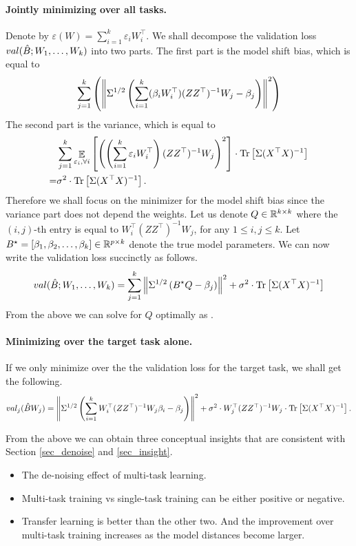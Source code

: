 \paragraph{Jointly minimizing over all tasks.}
Denote by $\varepsilon(W) = \sum_{i=1}^k \varepsilon_i W_i^{\top}$.
We shall decompose the validation loss $val(\hat{B}; W_1, \dots, W_k)$ into two parts.
The first part is the model shift bias, which is equal to
\begin{align*}
	\sum_{j=1}^k \left({\left\| \Sigma^{1/2}\left({\sum_{i=1}^k(\beta_i W_i^{\top}) (ZZ^{\top})^{-1} W_j - \beta_j}\right) \right\|^2}\right)
\end{align*}
The second part is the variance, which is equal to
\begin{align*}
	& \sum_{j=1}^k \mathop{\mathbb{E}}_{\varepsilon_i, \forall i}\left[ \left({\left({\sum_{i=1}^k \varepsilon_i W_i^{\top}}\right) (ZZ^{\top})^{-1} W_j}\right)^2 \right] \cdot {\operatorname{Tr}\left[\Sigma(X^{\top}X)^{-1}\right]} \\
	=& \sigma^2 \cdot \operatorname{Tr}\left[\Sigma (X^{\top}X)^{-1}\right].
\end{align*}
Therefore we shall focus on the minimizer for the model shift bias since the variance part does not depend the weights.
Let us denote $Q\in\mathbb{R}^{k\times k}$ where the $(i,j)$-th entry is equal to $W_i^{\top} (ZZ^{\top})^{-1} W_j$, for any $1\le i, j\le k$.
Let $B^{\star} = [\beta_1, \beta_2, \dots, \beta_k] \in\mathbb{R}^{p \times k}$ denote the true model parameters.
We can now write the validation loss succinctly as follows.
\begin{align*}
	val(\hat{B}; W_1, \dots, W_k) = \sum_{j=1}^k \left\| \Sigma^{1/2} \left({B^{\star} Q - \beta_j}\right) \right\|^2 + \sigma^2 \cdot \operatorname{Tr}\left[\Sigma (X^{\top}X)^{-1}\right]
\end{align*}
From the above we can solve for $Q$ optimally as .

\paragraph{Minimizing over the target task alone.}
If we only minimize over the the validation loss for the target task, we shall get the following.
\begin{align*}
	val_j(\hat{B} W_j) = \left\| \Sigma^{1/2}\left({\sum_{i=1}^k W_i^{\top} (ZZ^{\top})^{-1}W_j \beta_i - \beta_j}\right) \right\|^2
	+ \sigma^2 \cdot W_j^{\top} (ZZ^{\top})^{-1} W_j \cdot \operatorname{Tr}\left[\Sigma (X^{\top}X)^{-1}\right].
\end{align*}

From the above we can obtain three conceptual insights that are consistent with Section \ref{sec_denoise} and \ref{sec_insight}.
\begin{itemize}
	\item The de-noising effect of multi-task learning.
	\item Multi-task training vs single-task training can be either positive or negative.
	\item Transfer learning is better than the other two. And the improvement over multi-task training increases as the model distances become larger.
\end{itemize}






